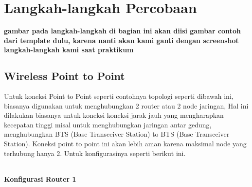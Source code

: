 \section{Langkah-langkah Percobaan}
\textbf{gambar pada langkah-langkah di bagian ini akan diisi gambar contoh dari template dulu,
		karena nanti akan kami ganti dengan screenshot langkah-langkah kami saat praktikum}
\subsection{Wireless Point to Point}
Untuk koneksi Point to Point seperti contohnya topologi seperti dibawah ini, biasanya digunakan untuk
menghubungkan 2 router atau 2 node jaringan, Hal ini dilakukan biasanya untuk koneksi koneksi
jarak jauh yang mengharapkan kecepatan tinggi misal untuk menghubungkan jaringan antar gedung,
menghubungkan BTS (Base Transceiver Station) to BTS (Base Transceiver Station). Koneksi point
to point ini akan lebih aman karena maksimal node yang terhubung hanya 2. Untuk konfigurasinya
seperti berikut ini.\\ \\

\begin{center} 
	\textbf{Konfigurasi Router 1}
\end{center}

